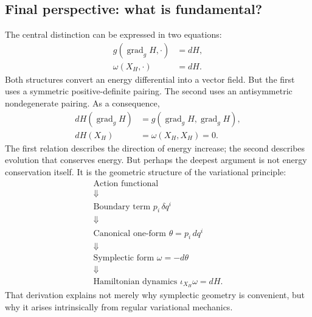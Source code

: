 \subsection{ Final perspective: what is fundamental?}
The central distinction can be expressed in two equations:
\[
\boxed{
\begin{aligned}
g(\operatorname{grad}_g H,\cdot)&=dH,\\
\omega(X_H,\cdot)&=dH.
\end{aligned}
}
\]
Both structures convert an energy differential into a vector field.
But the first uses a symmetric positive-definite pairing. The second uses an
antisymmetric nondegenerate pairing.
As a consequence,
\[
\boxed{
\begin{aligned}
dH(\operatorname{grad}_gH)&=
g(\operatorname{grad}_gH,\operatorname{grad}_gH),\\
dH(X_H)&=\omega(X_H,X_H)=0.
\end{aligned}
}
\]
The first relation describes the direction of energy increase; the second
describes evolution that conserves energy.
But perhaps the deepest argument is not energy conservation itself. It is the
geometric structure of the variational principle:
\[
\boxed{
\begin{gathered}
\text{Action functional}\\
\Downarrow\\
\text{Boundary term }p_i\,\delta q^i\\
\Downarrow\\
\text{Canonical one-form }\theta=p_i\,dq^i\\
\Downarrow\\
\text{Symplectic form }\omega=-d\theta\\
\Downarrow\\
\text{Hamiltonian dynamics }\iota_{X_H}\omega=dH.
\end{gathered}
}
\]
That derivation explains not merely why symplectic geometry is convenient, but
why it arises intrinsically from regular variational mechanics.

